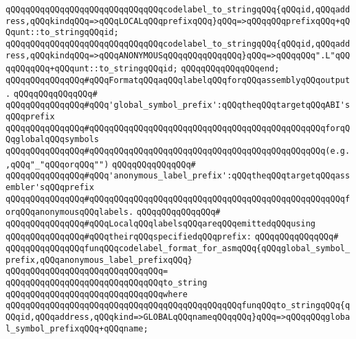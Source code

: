 \verb|qQQqqQQqqQQqqQQqqQQqqQQqqQQqqQQqcodelabel_to_stringqQQq{qQQqid,qQQqaddress,qQQqkindqQQq=>qQQqLOCALqQQqprefixqQQq}qQQq=>qQQqqQQqprefixqQQq+qQQqunt::to_stringqQQqid;|\newline
\verb|qQQqqQQqqQQqqQQqqQQqqQQqqQQqqQQqcodelabel_to_stringqQQq{qQQqid,qQQqaddress,qQQqkindqQQq=>qQQqANONYMOUSqQQqqQQqqQQqqQQq}qQQq=>qQQqqQQq".L"qQQqqQQqqQQq+qQQqunt::to_stringqQQqid;|\newline
\verb|qQQqqQQqqQQqqQQqend;|\newline
\newline
\verb|qQQqqQQqqQQqqQQq#qQQqFormatqQQqaqQQqlabelqQQqforqQQqassemblyqQQqoutput.|\newline
\verb|qQQqqQQqqQQqqQQq#|\newline
\verb|qQQqqQQqqQQqqQQq#qQQq'global_symbol_prefix':qQQqtheqQQqtargetqQQqABI'sqQQqprefix|\newline
\verb|qQQqqQQqqQQqqQQq#qQQqqQQqqQQqqQQqqQQqqQQqqQQqqQQqqQQqqQQqqQQqqQQqforqQQqglobalqQQqsymbols|\newline
\verb|qQQqqQQqqQQqqQQq#qQQqqQQqqQQqqQQqqQQqqQQqqQQqqQQqqQQqqQQqqQQqqQQq(e.g.,qQQq"_"qQQqorqQQq"")|\newline
\verb|qQQqqQQqqQQqqQQq#|\newline
\verb|qQQqqQQqqQQqqQQq#qQQq'anonymous_label_prefix':qQQqtheqQQqtargetqQQqassembler'sqQQqprefix|\newline
\verb|qQQqqQQqqQQqqQQq#qQQqqQQqqQQqqQQqqQQqqQQqqQQqqQQqqQQqqQQqqQQqqQQqqQQqforqQQqanonymousqQQqlabels.|\newline
\verb|qQQqqQQqqQQqqQQq#|\newline
\verb|qQQqqQQqqQQqqQQq#qQQqLocalqQQqlabelsqQQqareqQQqemittedqQQqusing|\newline
\verb|qQQqqQQqqQQqqQQq#qQQqtheirqQQqspecifiedqQQqprefix:|\newline
\verb|qQQqqQQqqQQqqQQq#|\newline
\verb|qQQqqQQqqQQqqQQqfunqQQqcodelabel_format_for_asmqQQq{qQQqglobal_symbol_prefix,qQQqanonymous_label_prefixqQQq}|\newline
\verb|qQQqqQQqqQQqqQQqqQQqqQQqqQQqqQQq=|\newline
\verb|qQQqqQQqqQQqqQQqqQQqqQQqqQQqqQQqto_string|\newline
\verb|qQQqqQQqqQQqqQQqqQQqqQQqqQQqqQQqwhere|\newline
\verb|qQQqqQQqqQQqqQQqqQQqqQQqqQQqqQQqqQQqqQQqqQQqqQQqfunqQQqto_stringqQQq{qQQqid,qQQqaddress,qQQqkind=>GLOBALqQQqnameqQQqqQQq}qQQq=>qQQqqQQqglobal_symbol_prefixqQQq+qQQqname;|\newline

